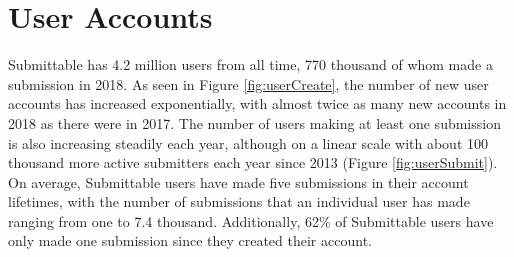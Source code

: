 \documentclass[]{report}   %
\begin{document}
\section{User Accounts}
Submittable has 4.2 million users from all time, 770 thousand of whom made a submission in 2018. As seen in Figure \ref{fig:userCreate}, the number of new user accounts has increased exponentially, with almost twice as many new accounts in 2018 as there were in 2017. The number of users making at least one submission is also increasing steadily each year, although on a linear scale with about 100 thousand more active submitters each year since 2013 (Figure \ref{fig:userSubmit}). On average, Submittable users have made five submissions in their account lifetimes, with the number of submissions that an individual user has made ranging from one to 7.4 thousand. Additionally, 62\% of Submittable users have only made one submission since they created their account.
\end{document}
